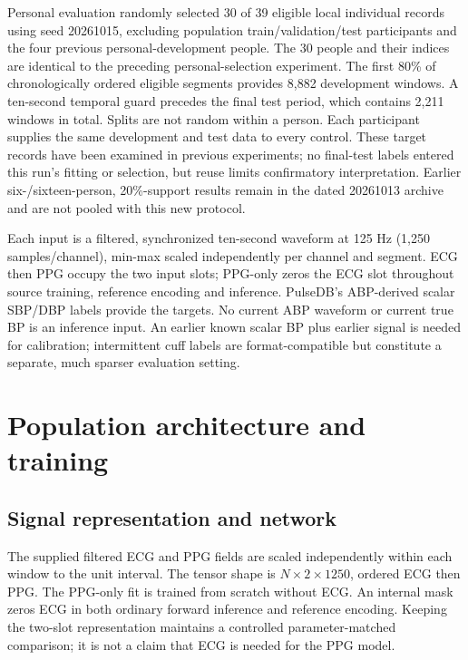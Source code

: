 \documentclass[conference]{IEEEtran}
\begin{document}
Personal evaluation randomly selected 30 of 39 eligible local individual records
using seed 20261015, excluding population train/validation/test participants
and the four previous personal-development people. The 30 people and their
indices are identical to the preceding personal-selection experiment.
The first 80\% of chronologically ordered eligible segments provides 8,882
development windows. A ten-second temporal guard precedes the final test period,
which contains 2,211 windows in total. Splits are not random within a person.
Each participant supplies the same development and test data to every control.
These target records have been examined in previous experiments; no final-test
labels entered this run's fitting or selection, but reuse limits confirmatory
interpretation. Earlier six-/sixteen-person, 20\%-support results remain in
the dated 20261013 archive and are not pooled with this new protocol.

Each input is a filtered, synchronized ten-second waveform at 125 Hz (1,250
samples/channel), min-max scaled independently per channel and segment.
ECG then PPG occupy the two input slots; PPG-only zeros the ECG slot throughout
source training, reference encoding and inference. PulseDB's ABP-derived scalar
SBP/DBP labels provide the targets. No current ABP waveform or current true BP
is an inference input. An earlier known scalar BP plus earlier signal is needed
for calibration; intermittent cuff labels are format-compatible but constitute
a separate, much sparser evaluation setting.
\section{Population architecture and training}
\subsection{Signal representation and network}
The supplied filtered ECG and PPG fields are scaled independently within each
window to the unit interval. The tensor shape is $N\times2\times1250$, ordered
ECG then PPG. The PPG-only fit is trained from scratch without ECG. An internal
mask zeros ECG in both ordinary forward inference and reference encoding.
Keeping the two-slot representation maintains a controlled parameter-matched
comparison; it is not a claim that ECG is needed for the PPG model.
\end{document}
